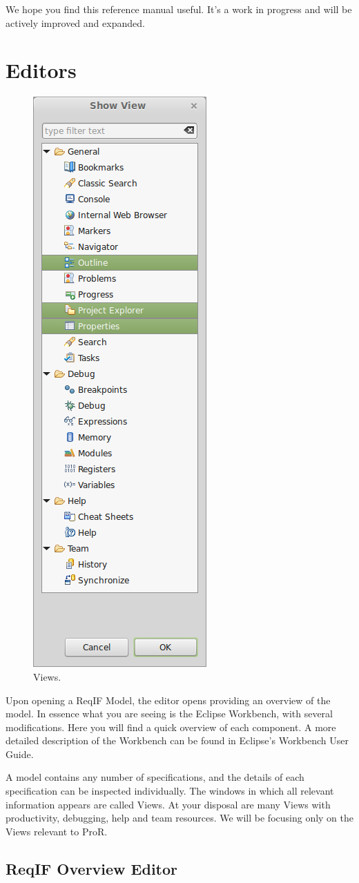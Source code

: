 We hope you find this reference manual useful.  It's a work in progress and will be actively improved and expanded.

\section{Editors}

\begin{figure}
\includegraphics[height=.9\textwidth]{../rmf-images/views_highlighted.png}
\caption[flushleft]{Views.}
\label{fig:Views}
\end{figure}


Upon opening a ReqIF Model, the editor opens providing an overview of the model.  In essence what you are seeing is the Eclipse Workbench, with several modifications.  Here you will find a quick overview of each component.  A more detailed description of the Workbench can be found in Eclipse's Workbench User Guide.

A model contains any number of specifications, and the details of each specification can be inspected individually.  The windows in which all relevant information appears are called Views.  At your disposal are many Views with productivity, debugging, help and team resources.  We will be focusing only on the Views relevant to ProR.

\subsection{ReqIF Overview Editor}

